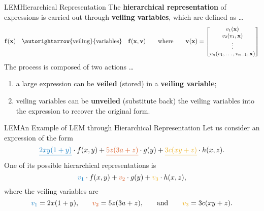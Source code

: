 \begin{frame}{\acl{LEM}}{Hierarchical Representation}
  The \textbf{hierarchical representation} of expressions is carried out through \textbf{veiling variables}, which are defined as \dots
  \begin{equation*}
    \m{f}(\mx) \quad \autorightarrow{\text{veiling}}{\text{variables}} \quad \m{f}(\mx, \m{v})
    \qquad \text{where} \qquad
    \m{v}(\mx) = \msmall{\begin{bmatrix}
      v_{1}(\mx) \\
      v_{2}(v_{1}, \mx) \\
      \vdots \\
      v_{n}(v_{1}, \dots, v_{n-1}, \mx)
    \end{bmatrix}}
  \end{equation*}
  The process is composed of two actions \dots
  \begin{enumerate}
    \item a large expression can be \textbf{veiled} (stored) in a \textbf{veiling variable};
    \item veiling variables can be \textbf{unveiled} (substitute back) the veiling variables into the expression to recover the original form.
  \end{enumerate}
  \vspace{0.5em}
\end{frame}

\begin{frame}{\acl{LEM}}{An Example of \acs{LEM} through Hierarchical Representation}
  Let us consider an expression of the form
  \begin{equation*}
    \textcolor{mycolor1}{\underline{2xy(1+y)}} \cdot f(x,y) +
    \textcolor{mycolor2}{\underline{5z(3a+z)}} \cdot g(y) +
    \textcolor{mycolor3}{\underline{3c(xy+z)}} \cdot h(x,z) \text{.}
  \end{equation*}
  One of its possible hierarchical representations is
  \begin{equation*}
    \textcolor{mycolor1}{v_1} \cdot f(x,y) +
    \textcolor{mycolor2}{v_2} \cdot g(y) +
    \textcolor{mycolor3}{v_3} \cdot h(x,z) \text{,}
  \end{equation*}
  where the veiling variables are
  \begin{equation*}
    \textcolor{mycolor1}{v_1} = 2x(1+y) \text{,}
    \qquad
    \textcolor{mycolor2}{v_2} = 5z(3a+z) \text{,}
    \qquad \text{and} \qquad
    \textcolor{mycolor3}{v_3} = 3c(xy+z) \text{.}
  \end{equation*}
\end{frame}


